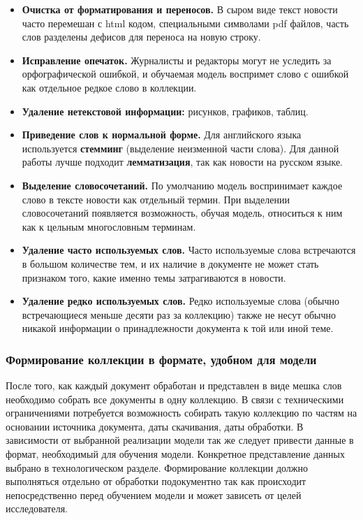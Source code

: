 \begin{itemize}
    \item\textbf{Очистка от форматирования и переносов.} В сыром виде текст новости часто перемешан с html кодом, специальными символами pdf файлов, часть слов разделены дефисов для переноса на новую строку.
    \item\textbf{Исправление опечаток.} Журналисты и редакторы могут не уследить за орфографической ошибкой, и обучаемая модель воспримет слово с ошибкой как отдельное редкое слово в коллекции.
    \item\textbf{Удаление нетекстовой информации:} рисунков, графиков, таблиц.
    \item\textbf{Приведение слов к нормальной форме.} Для английского языка используется \textbf{стемминг} (выделение неизменной части слова). Для данной работы лучше подходит \textbf{лемматизация}, так как новости на русском языке.
    \item\textbf{Выделение словосочетаний.} По умолчанию модель воспринимает каждое слово в тексте новости как отдельный термин. При выделении словосочетаний появляется возможность, обучая модель, относиться к ним как к цельным многословным терминам.
    \item\textbf{Удаление часто используемых слов.} Часто используемые слова встречаются в большом количестве тем, и их наличие в документе не может стать признаком того, какие именно темы затрагиваются в новости. 
    \item\textbf{Удаление редко используемых слов.} Редко используемые слова (обычно встречающиеся меньше десяти раз за коллекцию) также не несут обычно никакой информации о принадлежности документа к той или иной теме.
\end{itemize}

%
\subsubsection{Формирование коллекции в формате, удобном для модели}

После того, как каждый документ обработан и представлен в виде мешка слов необходимо собрать все документы в одну коллекцию. В связи с техническими ограничениями потребуется возможность собирать такую коллекцию по частям на основании источника документа, даты скачивания, даты обработки. В зависимости от выбранной реализации модели так же следует привести данные в формат, необходимый для обучения модели. Конкретное представление данных выбрано в технологическом разделе. Формирование коллекции должно выполняться отдельно от обработки подокументно так как происходит непосредственно перед обучением модели и может зависеть от целей исследователя.

